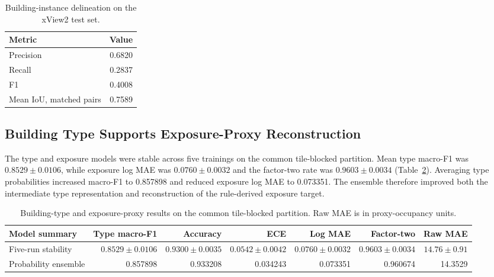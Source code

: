 \begin{table}[h!]
\centering
\caption{Building-instance delineation on the xView2 test set.}
\label{tab:stage1_results}
\small
\begin{tabular}{lr}
\toprule
Metric & Value \\
\midrule
Precision & 0.6820 \\
Recall & 0.2837 \\
F1 & 0.4008 \\
Mean IoU, matched pairs & 0.7589 \\
\bottomrule
\end{tabular}
\end{table}


\subsection{Building Type Supports Exposure-Proxy Reconstruction}
\label{sec:exp_stage2a}

The type and exposure models were stable across five trainings on the common tile-blocked partition. Mean type macro-F1 was $0.8529\pm0.0106$, while exposure log MAE was $0.0760\pm0.0032$ and the factor-two rate was $0.9603\pm0.0034$ (Table~\ref{tab:stage2a_main}). Averaging type probabilities increased macro-F1 to 0.857898 and reduced exposure log MAE to 0.073351. The ensemble therefore improved both the intermediate type representation and reconstruction of the rule-derived exposure target.

\begin{table}[t]
\centering
\caption{Building-type and exposure-proxy results on the common tile-blocked partition. Raw MAE is in proxy-occupancy units.}
\label{tab:stage2a_main}
\scriptsize
\setlength{\tabcolsep}{2pt}
\begin{tabular}{lrrrrrr}
\toprule
Model summary & Type macro-F1 & Accuracy & ECE & Log MAE & Factor-two & Raw MAE \\
\midrule
Five-run stability & $0.8529\!\pm\!0.0106$ & $0.9300\!\pm\!0.0035$ & $0.0542\!\pm\!0.0042$ & $0.0760\!\pm\!0.0032$ & $0.9603\!\pm\!0.0034$ & $14.76\!\pm\!0.91$ \\
Probability ensemble & 0.857898 & 0.933208 & 0.034243 & 0.073351 & 0.960674 & 14.3529 \\
\bottomrule
\end{tabular}
\end{table}

